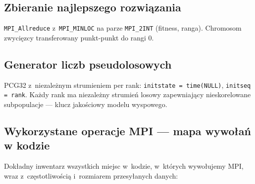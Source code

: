 \documentclass{common/sprawozdanie-agh}
\begin{document}
\subsection{Zbieranie najlepszego rozwiązania}

\texttt{MPI\_Allreduce} z~\texttt{MPI\_MINLOC} na parze \texttt{MPI\_2INT} (fitness, ranga). Chromosom zwycięzcy transferowany punkt-punkt do rangi 0.

\subsection{Generator liczb pseudolosowych}

PCG32 z~niezależnym strumieniem per rank: \texttt{initstate = time(NULL)}, \texttt{initseq = rank}. Każdy rank ma niezależny strumień losowy zapewniający nieskorelowane subpopulacje --- klucz jakościowy modelu wyspowego.

\subsection{Wykorzystane operacje MPI --- mapa wywołań w kodzie}
\label{sec:mpi-ops}

Dokładny inwentarz wszystkich miejsc w~kodzie, w~których wywołujemy MPI, wraz z~częstotliwością i~rozmiarem przesyłanych danych:
\end{document}
